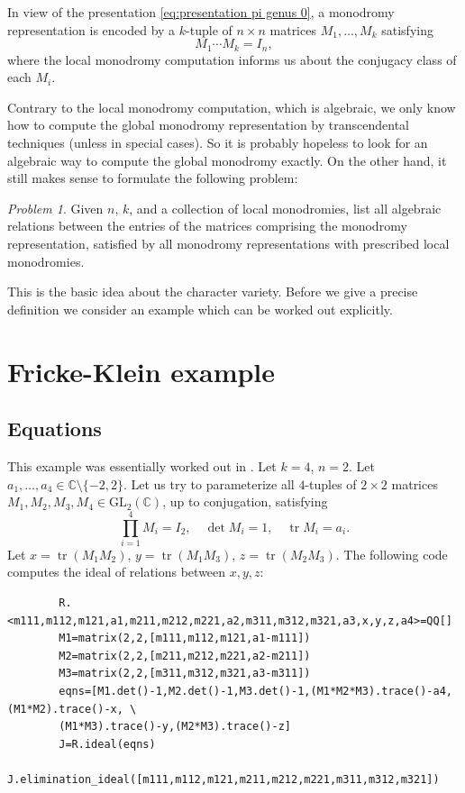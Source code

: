 \documentclass[12pt]{amsart}
\theoremstyle{definition}
\theoremstyle{remark}
\newtheorem{problem}[theorem]{Problem}
\numberwithin{equation}{section}
\newcommand{\BC}{\mathbb C}
\DeclareMathOperator{\trace}{tr}
\begin{document}
	In view of the presentation \eqref{eq:presentation pi genus 0}, a monodromy representation is encoded by a $k$-tuple of $n\times n$ matrices $M_1, \ldots, M_k$ satisfying
	\[
	M_1 \cdots M_k = I_n,
	\]
	where the local monodromy computation informs us about the conjugacy class of each $M_i$. 
	
	Contrary to the local monodromy computation, which is algebraic, we only know how to compute the global monodromy representation by transcendental techniques (unless in special cases). So it is probably hopeless to look for an algebraic way to compute the global monodromy exactly. On the other hand, it still makes sense to formulate the following problem:
	
	\begin{problem}
		Given $n$, $k$, and a collection of local monodromies, list all algebraic relations between the entries of the matrices comprising the monodromy representation, satisfied by all monodromy representations with prescribed local monodromies.
	\end{problem}
	
	This is the basic idea about the character variety. Before we give a precise definition we consider an example which can be worked out explicitly.
	
	\section{Fricke-Klein example}
	
	\subsection{Equations}
	This example was essentially worked out in \cite{fricke1965vorlesungen}.
	Let $k=4$, $n=2$. Let $a_1,\ldots,a_4\in\BC\setminus\{-2,2\}$. Let us try to parameterize all $4$-tuples of $2\times 2$ matrices $M_1, M_2, M_3, M_4\in \mathrm{GL}_2(\mathbb{C})$, up to conjugation, satisfying 
	\[
	\prod_{i=1}^4 M_i = I_2, \quad \det M_i = 1, \quad \trace M_i=a_i.
	\]
	Let $x=\trace (M_1 M_2)$, $y=\trace (M_1 M_3)$, $z=\trace (M_2 M_3)$. The following code computes the ideal of relations between $x,y,z$:
	
	\begin{verbatim}
		R.<m111,m112,m121,a1,m211,m212,m221,a2,m311,m312,m321,a3,x,y,z,a4>=QQ[]
		M1=matrix(2,2,[m111,m112,m121,a1-m111])
		M2=matrix(2,2,[m211,m212,m221,a2-m211])
		M3=matrix(2,2,[m311,m312,m321,a3-m311])
		eqns=[M1.det()-1,M2.det()-1,M3.det()-1,(M1*M2*M3).trace()-a4,(M1*M2).trace()-x, \
		(M1*M3).trace()-y,(M2*M3).trace()-z]
		J=R.ideal(eqns)
		J.elimination_ideal([m111,m112,m121,m211,m212,m221,m311,m312,m321])
	\end{verbatim}
	
\end{document}
